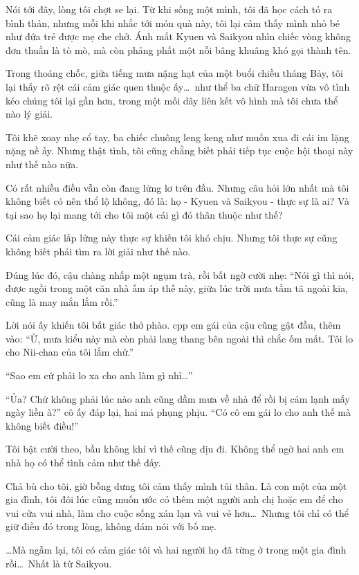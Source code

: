 \documentclass[../main.tex]{subfiles}
\begin{document}
Nói tới đây, lòng tôi chợt se lại. Từ khi sống một mình, tôi đã học cách tỏ ra bình thản, nhưng mỗi khi nhắc tới món quà này, tôi lại cảm thấy mình nhỏ bé như đứa trẻ được mẹ che chở. Ánh mắt Kyuen và Saikyou nhìn chiếc vòng không đơn thuần là tò mò, mà còn phảng phất một nỗi bâng khuâng khó gọi thành tên.

Trong thoáng chốc, giữa tiếng mưa nặng hạt của một buổi chiều tháng Bảy, tôi lại thấy rõ rệt cái cảm giác quen thuộc ấy\dots\ như thể ba chữ Haragen vừa vô tình kéo chúng tôi lại gần hơn, trong một mối dây liên kết vô hình mà tôi chưa thể nào lý giải.

Tôi khẽ xoay nhẹ cổ tay, ba chiếc chuông leng keng như muốn xua đi cái im lặng nặng nề ấy. Nhưng thật tình, tôi cũng chằng biết phải tiếp tục cuộc hội thoại này như thế nào nữa.

Có rất nhiều điều vẫn còn đang lửng lơ trên đầu. Nhưng câu hỏi lớn nhất mà tôi không biết có nên thổ lộ không, đó là: họ - Kyuen và Saikyou - thực sự là ai? Và tại sao họ lại mang tới cho tôi một cái gì đó thân thuộc như thế?

Cái cảm giác lấp lửng này thực sự khiến tôi khó chịu. Nhưng tôi thực sự cũng không biết phải tìm ra lời giải như thế nào.

Đúng lúc đó, cậu chàng nhấp một ngụm trà, rồi bất ngờ cười nhẹ: ``Nói gì thì nói, được ngồi trong một căn nhà ấm áp thế này, giữa lúc trời mưa tầm tã ngoài kia, cũng là may mắn lắm rồi.''

Lời nói ấy khiến tôi bất giác thở phào. cpp em gái của cậu cũng gật đầu, thêm vào: ``Ừ, mưa kiểu này mà còn phải lang thang bên ngoài thì chắc ốm mất. Tôi lo cho Nii-chan của tôi lắm chứ.''

``Sao em cứ phải lo xa cho anh làm gì nhỉ\dots''

``Ủa? Chứ không phải lúc nào anh cũng dầm mưa về nhà để rồi bị cảm lạnh mấy ngày liền à?'' cô ấy đáp lại, hai má phụng phịu. ``Có cô em gái lo cho anh thế mà không biết điều!''

Tôi bật cười theo, bầu không khí vì thế cũng dịu đi. Không thể ngờ hai anh em nhà họ có thể tình cảm như thế đấy.

Chả bù cho tôi, giờ bỗng dưng tôi cảm thấy mình tủi thân. Là con một của một gia đình, tôi đôi lúc cũng muốn ước có thêm một người anh chị hoặc em để cho vui cửa vui nhà, làm cho cuộc sống xán lạn và vui vẻ hơn\dots\ Nhưng tôi chỉ có thể giữ điều đó trong lòng, không dám nói với bố mẹ.

\dots Mà ngẫm lại, tôi có cảm giác tôi và hai người họ đã từng ở trong một gia đình rồi\dots\ Nhất là từ Saikyou.
\end{document}
